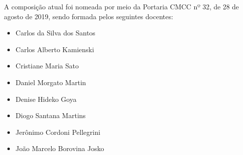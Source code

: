 A composição atual foi nomeada por meio da Portaria CMCC nº 32, de 28 de agosto de 2019, sendo
formada pelos seguintes docentes:
\begin{itemize}
    \item Carlos da Silva dos Santos
    \item Carlos Alberto Kamienski
    \item Cristiane Maria Sato
    \item Daniel Morgato Martin
    \item Denise Hideko Goya
    \item Diogo Santana Martins
    \item Jerônimo Cordoni Pellegrini
    \item João Marcelo Borovina Josko
\end{itemize}
